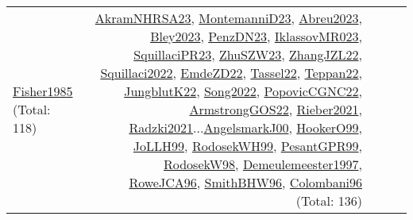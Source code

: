 {\begin{longtable}{p{3cm}r>{\raggedright\arraybackslash}p{6cm}>{\raggedright\arraybackslash}p{6cm}>{\raggedright\arraybackslash}p{8cm}}
\hyperref[detail:Fisher1985]{Fisher1985} (Total: 118) & \hyperref[detail:AkramNHRSA23]{AkramNHRSA23}, \hyperref[detail:MontemanniD23]{MontemanniD23}, \hyperref[detail:Abreu2023]{Abreu2023}, \hyperref[detail:Bley2023]{Bley2023}, \hyperref[detail:PenzDN23]{PenzDN23}, \hyperref[detail:IklassovMR023]{IklassovMR023}, \hyperref[detail:SquillaciPR23]{SquillaciPR23}, \hyperref[detail:ZhuSZW23]{ZhuSZW23}, \hyperref[detail:ZhangJZL22]{ZhangJZL22}, \hyperref[detail:Squillaci2022]{Squillaci2022}, \hyperref[detail:EmdeZD22]{EmdeZD22}, \hyperref[detail:Tassel22]{Tassel22}, \hyperref[detail:Teppan22]{Teppan22}, \hyperref[detail:JungblutK22]{JungblutK22}, \hyperref[detail:Song2022]{Song2022}, \hyperref[detail:PopovicCGNC22]{PopovicCGNC22}, \hyperref[detail:ArmstrongGOS22]{ArmstrongGOS22}, \hyperref[detail:Rieber2021]{Rieber2021}, \hyperref[detail:Radzki2021]{Radzki2021}...\hyperref[detail:AngelsmarkJ00]{AngelsmarkJ00}, \hyperref[detail:HookerO99]{HookerO99}, \hyperref[detail:JoLLH99]{JoLLH99}, \hyperref[detail:RodosekWH99]{RodosekWH99}, \hyperref[detail:PesantGPR99]{PesantGPR99}, \hyperref[detail:RodosekW98]{RodosekW98}, \hyperref[detail:Demeulemeester1997]{Demeulemeester1997}, \hyperref[detail:RoweJCA96]{RoweJCA96}, \hyperref[detail:SmithBHW96]{SmithBHW96}, \hyperref[detail:Colombani96]{Colombani96} (Total: 136)\\

\end{longtable}}
